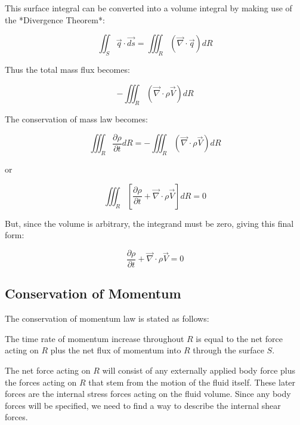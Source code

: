 This surface integral can be converted into a volume integral by making use of
the *Divergence Theorem*:

\begin{equation}
\iint_S \overrightarrow{q}\cdot\overrightarrow{ds} = \iiint_R \left( \overrightarrow{\nabla} \cdot \overrightarrow{q}\right) dR
\end{equation}

Thus the total mass flux becomes:

\begin{equation}
-\iiint_R \left( \overrightarrow{\nabla}\cdot\rho\overrightarrow{V}\right) dR
\end{equation}

The conservation of mass law becomes:
    
\begin{equation}
\iiint_R \frac{\partial\rho}{\partial t} dR = -\iiint_R ( \overrightarrow{\nabla}\cdot\rho\overrightarrow{V}) dR
\end{equation}

or

\begin{equation}
\iiint_R \left[\frac{\partial\rho}{\partial t} + \overrightarrow{\nabla}\cdot\rho\overrightarrow{V}\right] dR = 0
\end{equation}

But, since the volume is arbitrary, the integrand must be zero, giving this final form:

\begin{equation}
\frac{\partial\rho}{\partial t} + \overrightarrow{\nabla}\cdot\rho\overrightarrow{V} = 0
\end{equation}

\subsection{Conservation of Momentum}

The conservation of momentum law is stated as follows:

The time rate of momentum increase throughout $R$ is equal to the net force
acting on $R$ plus the net flux of momentum into $R$ through the surface $S$.

The net force acting on $R$ will consist of any externally applied body force
plus the forces acting on $R$ that stem from the motion of the fluid itself.
These later forces are the internal stress forces acting on the fluid volume.
Since any body forces will be specified, we need to find a way to describe the
internal shear forces.  

